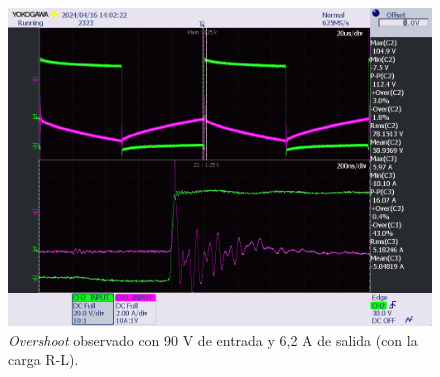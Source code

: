 \begin{figure}[H]
	\centering
	\includegraphics[width=0.7\linewidth]{fig/overshootFinal4}
	\caption{\textit{Overshoot} observado con 90 V de entrada y 6,2 A de salida (con la carga R-L).}
\end{figure}

